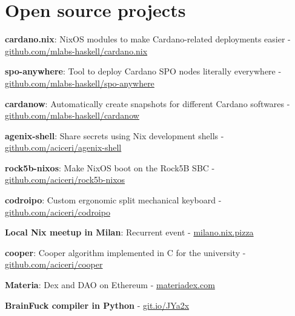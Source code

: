 \documentclass[]{cv}
\begin{document}
\begin{minipage}[t]{0.75\textwidth}
\section{Open source projects}
\vspace{+0.5em}
\begin{tightemize}
\item \textbf{cardano.nix}: NixOS modules to make Cardano-related deployments easier - \href{https://github.com/mlabs-haskell/cardano.nix}{github.com/mlabs-haskell/cardano.nix}
\item \textbf{spo-anywhere}: Tool to deploy Cardano SPO nodes literally everywhere - \href{https://github.com/mlabs-haskell/spo-anywhere}{github.com/mlabs-haskell/spo-anywhere}
\item \textbf{cardanow}: Automatically create snapshots for different Cardano softwares - \href{https://github.com/mlabs-haskell/cardanow}{github.com/mlabs-haskell/cardanow}
\item \textbf{agenix-shell}: Share secrets using Nix development shells - \href{https://github.com/aciceri/agenix-shell}{github.com/aciceri/agenix-shell}
\item \textbf{rock5b-nixos}: Make NixOS boot on the Rock5B SBC - \href{https://github.com/aciceri/rock5b-nixos}{github.com/aciceri/rock5b-nixos}
\item \textbf{codroipo}: Custom ergonomic split mechanical keyboard - \href{https://github.com/aciceri/codroipo}{github.com/aciceri/codroipo}
\item \textbf{Local Nix meetup in Milan}: Recurrent event - \href{https://milano.nix.pizza}{milano.nix.pizza}
\item \textbf{cooper}: Cooper algorithm implemented in C for the university - \href{https://github.com/aciceri/cooper}{github.com/aciceri/cooper}
\item \textbf{Materia}: Dex and DAO on Ethereum - \href{https://materiadex.com}{materiadex.com}
\item \textbf{BrainFuck compiler in Python} - \href{https://git.io/JYa2x}{git.io/JYa2x}
\end{tightemize}
\sectionsep


\end{minipage}
\end{document}
